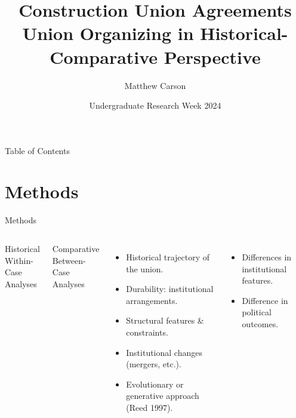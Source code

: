\documentclass{beamer}
\title[Union Organizing]{Construction Union Agreements\\
Union Organizing in Historical-Comparative Perspective}
\author{Matthew Carson}
\date[Undergraduate Research Week '24]{Undergraduate Research Week 2024}
\begin{document}
\begin{frame}
  \titlepage
\end{frame}

\begin{frame}{Table of Contents}
  \tableofcontents
\end{frame}

\section{Methods}
\begin{frame}{Methods}
\begin{columns}
	\newline
		\begin{minipage}[t][0.25\textheight][t]{\linewidth}
			Historical\\
			Within-Case\\
			Analyses
		\end{minipage}
		\vfill
		\begin{minipage}[b][0.4\textheight][b]{\linewidth}
			Comparative\\
			Between-Case\\
			Analyses
		\end{minipage}
	\newline
		\begin{minipage}[t][0.25\textheight][t]{\linewidth}
			\begin{itemize}
				\item Historical trajectory of the union.
				\item Durability: institutional arrangements.
				\item Structural features \& constraints.
				\item Institutional changes (mergers, etc.).
				\item Evolutionary or generative approach (Reed 1997).
			\end{itemize}
		\end{minipage}
		\vfill
		\begin{minipage}[b][0.4\textheight][b]{\linewidth}
			\begin{itemize}
				\item Differences in institutional features.
				\item Difference in political outcomes.
			\end{itemize}
		\end{minipage}
		\newline
		\newline
\end{columns}
\end{frame}
\end{document}
